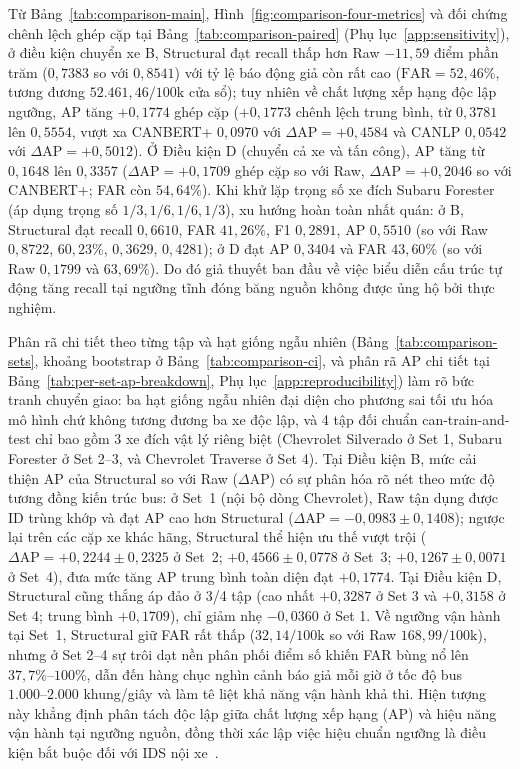 \documentclass[12pt, a4paper, reqno, oneside]{book}
\begin{document}
Từ Bảng~\ref{tab:comparison-main}, Hình~\ref{fig:comparison-four-metrics} và đối chứng chênh lệch ghép cặp tại Bảng~\ref{tab:comparison-paired} (Phụ lục~\ref{app:sensitivity}), ở điều kiện chuyển xe B, Structural đạt recall thấp hơn Raw $-11{,}59$ điểm phần trăm ($0{,}7383$ so với $0{,}8541$) với tỷ lệ báo động giả còn rất cao ($\text{FAR} = 52{,}46\%$, tương đương $52.461{,}46/100\text{k}$ cửa sổ); tuy nhiên về chất lượng xếp hạng độc lập ngưỡng, AP tăng $+0{,}1774$ ghép cặp ($+0{,}1773$ chênh lệch trung bình, từ $0{,}3781$ lên $0{,}5554$, vượt xa CANBERT+ $0{,}0970$ với $\Delta\text{AP} = +0{,}4584$ và CANLP $0{,}0542$ với $\Delta\text{AP} = +0{,}5012$). Ở Điều kiện D (chuyển cả xe và tấn công), AP tăng từ $0{,}1648$ lên $0{,}3357$ ($\Delta\text{AP} = +0{,}1709$ ghép cặp so với Raw, $\Delta\text{AP} = +0{,}2046$ so với CANBERT+; FAR còn $54{,}64\%$). Khi khử lặp trọng số xe đích Subaru Forester (áp dụng trọng số $1/3, 1/6, 1/6, 1/3$), xu hướng hoàn toàn nhất quán: ở B, Structural đạt recall $0{,}6610$, FAR $41{,}26\%$, F1 $0{,}2891$, AP $0{,}5510$ (so với Raw $0{,}8722$, $60{,}23\%$, $0{,}3629$, $0{,}4281$); ở D đạt AP $0{,}3404$ và FAR $43{,}60\%$ (so với Raw $0{,}1799$ và $63{,}69\%$). Do đó giả thuyết ban đầu về việc biểu diễn cấu trúc tự động tăng recall tại ngưỡng tĩnh đóng băng nguồn không được ủng hộ bởi thực nghiệm.

Phân rã chi tiết theo từng tập và hạt giống ngẫu nhiên (Bảng~\ref{tab:comparison-sets}, khoảng bootstrap ở Bảng~\ref{tab:comparison-ci}, và phân rã AP chi tiết tại Bảng~\ref{tab:per-set-ap-breakdown}, Phụ lục~\ref{app:reproducibility}) làm rõ bức tranh chuyển giao: ba hạt giống ngẫu nhiên đại diện cho phương sai tối ưu hóa mô hình chứ không tương đương ba xe độc lập, và 4 tập đối chuẩn can-train-and-test chỉ bao gồm 3 xe đích vật lý riêng biệt (Chevrolet Silverado ở Set 1, Subaru Forester ở Set 2--3, và Chevrolet Traverse ở Set 4). Tại Điều kiện B, mức cải thiện AP của Structural so với Raw ($\Delta\text{AP}$) có sự phân hóa rõ nét theo mức độ tương đồng kiến trúc bus: ở Set~1 (nội bộ dòng Chevrolet), Raw tận dụng được ID trùng khớp và đạt AP cao hơn Structural ($\Delta\text{AP} = -0{,}0983 \pm 0{,}1408$); ngược lại trên các cặp xe khác hãng, Structural thể hiện ưu thế vượt trội ($\Delta\text{AP} = +0{,}2244 \pm 0{,}2325$ ở Set~2; $+0{,}4566 \pm 0{,}0778$ ở Set~3; $+0{,}1267 \pm 0{,}0071$ ở Set~4), đưa mức tăng AP trung bình toàn diện đạt $+0{,}1774$. Tại Điều kiện D, Structural cũng thắng áp đảo ở 3/4 tập (cao nhất $+0{,}3287$ ở Set 3 và $+0{,}3158$ ở Set 4; trung bình $+0{,}1709$), chỉ giảm nhẹ $-0{,}0360$ ở Set 1. Về ngưỡng vận hành tại Set~1, Structural giữ FAR rất thấp ($32{,}14/100\text{k}$ so với Raw $168{,}99/100\text{k}$), nhưng ở Set 2--4 sự trôi dạt nền phân phối điểm số khiến FAR bùng nổ lên $37{,}7\%\text{--}100\%$, dẫn đến hàng chục nghìn cảnh báo giả mỗi giờ ở tốc độ bus $1.000\text{--}2.000$ khung/giây và làm tê liệt khả năng vận hành khả thi. Hiện tượng này khẳng định phân tách độc lập giữa chất lượng xếp hạng (AP) và hiệu năng vận hành tại ngưỡng nguồn, đồng thời xác lập việc hiệu chuẩn ngưỡng là điều kiện bắt buộc đối với IDS nội xe~\cite{axelsson2000base,sommer2010outside,saito2015pr,lampe2024curated}.
\end{document}
